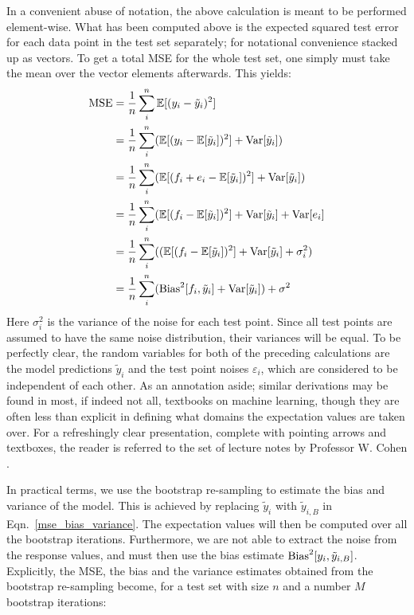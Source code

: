 \documentclass[reprint, english, nofootinbib]{revtex4-2}
\begin{document}
        In a convenient abuse of notation, the above calculation is meant to be performed element-wise. What has been computed above is the expected squared test error for each data point in the test set separately; for notational convenience stacked up as vectors. To get a total MSE for the whole test set, one simply must take the mean over the vector elements afterwards. This yields:
        \begin{align}
        \label{mse_bias_variance}
        \begin{split}
        \textup{MSE} &= \frac{1}{n} \sum^{n}_{i} \mathbb{E} [(y_{i} - \tilde{y}_{i})^2]  \\
        &= \frac{1}{n} \sum^{n}_{i} (\mathbb{E}[(y_{i} - \mathbb{E}[\tilde{y}_{i}])^2]+\textup{Var}[\tilde{y}_{i}]) \\
        &= \frac{1}{n} \sum^{n}_{i} (\mathbb{E}[(f_{i} + e_{i} - \mathbb{E}[\tilde{y}_{i}])^2] + \textup{Var}[\tilde{y}_{i}]) \\
        &= \frac{1}{n} \sum^{n}_{i} (\mathbb{E}[(f_{i} - \mathbb{E}[\tilde{y}_{i}])^2] + \textup{Var}[\tilde{y}_{i}] + \textup{Var}[e_{i}] \\
        &= \frac{1}{n} \sum^{n}_{i} ((\mathbb{E}[(f_{i} - \mathbb{E}[\tilde{y}_{i}])^2] + \textup{Var}[\tilde{y}_{i}] + \sigma_{i}^2) \\
        &=  \frac{1}{n} \sum^{n}_{i} (\textup{Bias}^2[f_i,\tilde{y}_{i}] + \textup{Var}[\tilde{y}_{i}]) + \sigma^2
        \end{split}
        \end{align}
        Here $\sigma_{i}^2$ is the variance of the noise for each test point. Since all test points are assumed to have the same noise distribution, their variances will be equal.  To be perfectly clear, the random variables for both of the preceding calculations are the model predictions $\tilde{y}_{i}$ and the test point noises $\varepsilon_{i}$, which are considered to be independent of each other. As an annotation aside; similar derivations may be found in most, if indeed not all, textbooks on machine learning, though they are often less than explicit in defining what domains the expectation values are taken over. For a refreshingly clear presentation, complete with pointing arrows and textboxes, the reader is referred to the set of lecture notes by Professor W. Cohen \cite{cohen}.

        In practical terms, we use the bootstrap re-sampling to estimate the bias and variance of the model. This is achieved by replacing $\tilde{y}_{i}$ with $\tilde{y}_{i,B}$ in Eqn.~\ref{mse_bias_variance}. The expectation values will then be computed over all the bootstrap iterations. Furthermore, we are not able to extract the noise from the response values, and must then use the bias estimate $\textup{Bias}^2[y_{i},\tilde{y}_{i,B}]$. Explicitly, the MSE, the bias and the variance estimates obtained from the bootstrap re-sampling become, for a test set with size $n$ and a number $M$ bootstrap iterations:
\end{document}

